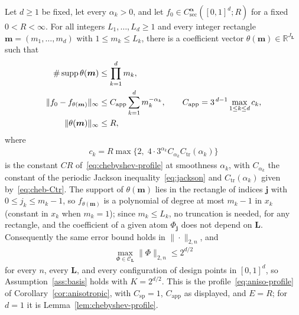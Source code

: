 \begin{auxlemma}
\label{lem:chebyshev-aniso-profile}
Let $d\geq1$ be fixed, let every $\alpha_k>0$, and let $f_0\in C^{\boldsymbol\alpha}_{\mathrm{sec}}([0,1]^d;R)$ for a fixed $0<R<\infty$. For all integers $L_1,\ldots,L_d\geq1$ and every integer rectangle $\boldsymbol m=(m_1,\ldots,m_d)$ with $1\leq m_k\leq L_k$, there is a coefficient vector $\theta(\boldsymbol m)\in\mathbb R^{J_{\boldsymbol L}}$ such that
\begin{align}
\#\operatorname{supp}\theta(\boldsymbol m)
&\leq\prod_{k=1}^dm_k,\notag\\
\|f_0-f_{\theta(\boldsymbol m)}\|_\infty
&\leq C_{\mathrm{app}}\sum_{k=1}^dm_k^{-\alpha_k},
\qquad C_{\mathrm{app}}=3^{\,d-1}\max_{1\leq k\leq d}c_k,
\label{eq:chebyshev-aniso-profile}\\
\|\theta(\boldsymbol m)\|_\infty&\leq R,\notag
\end{align}
where
\begin{align*}
c_k=R\max\bigl\{2,\;4\cdot3^{\alpha_k}C_{\alpha_k}C_{\mathrm{tr}}(\alpha_k)\bigr\}
\end{align*}
is the constant $CR$ of~\eqref{eq:chebyshev-profile} at smoothness $\alpha_k$, with $C_{\alpha_k}$ the constant of the periodic Jackson inequality~\eqref{eq:jackson} and $C_{\mathrm{tr}}(\alpha_k)$ given by~\eqref{eq:cheb-Ctr}. The support of $\theta(\boldsymbol m)$ lies in the rectangle of indices $\boldsymbol j$ with $0\leq j_k\leq m_k-1$, so $f_{\theta(\boldsymbol m)}$ is a polynomial of degree at most $m_k-1$ in $x_k$ (constant in $x_k$ when $m_k=1$); since $m_k\leq L_k$, no truncation is needed, for any rectangle, and the coefficient of a given atom $\Phi_{\boldsymbol j}$ does not depend on $\boldsymbol L$. Consequently the same error bound holds in $\|\cdot\|_{2,n}$, and
\begin{align*}
\max_{\Phi\in\mathcal C_{\boldsymbol L}}\|\Phi\|_{2,n}\leq2^{d/2}
\end{align*}
for every $n$, every $\boldsymbol L$, and every configuration of design points in $[0,1]^d$, so Assumption~\ref{ass:basis} holds with $K=2^{d/2}$. This is the profile~\eqref{eq:aniso-profile} of Corollary~\ref{cor:anisotropic}, with $C_{\mathrm{sp}}=1$, $C_{\mathrm{app}}$ as displayed, and $E=R$; for $d=1$ it is Lemma~\ref{lem:chebyshev-profile}.
\end{auxlemma}

